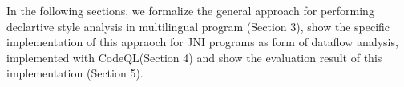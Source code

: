 In the following sections, we formalize the general approach for performing
declartive style analysis in multilingual program (Section 3), show the
specific implementation of this appraoch for JNI programs as form of dataflow
analysis, implemented with CodeQL(Section 4) and show the evaluation result of
this implementation (Section 5).
